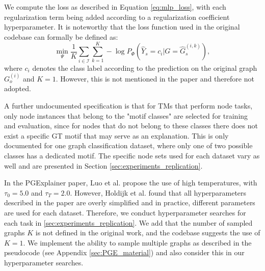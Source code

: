 We compute the loss as described in Equation \ref{eq:mlp_loss}, with each regularization term being added according to a regularization coefficient hyperparameter. It is noteworthy that the loss function used in the original codebase can formally be defined as:
\begin{equation}
    \min_\Psi \frac{1}{K}\sum_{i\in \mathcal{I}}\sum_{k=1}^K -\log P_\Phi(\hat{Y}_s = c_i|G=\hat{G}_s^{(i,k)}),
\end{equation}
where $c_i$ denotes the class label according to the prediction on the original graph $G_o^{(i)}$ and $K=1$. However, this is not mentioned in the paper and therefore not adopted.  \bigskip

A further undocumented specification is that for \acp{TM} that perform node tasks, only node instances that belong to the "motif classes" are selected for training and evaluation, since for nodes that do not belong to these classes there does not exist a specific \ac{GT} motif that may serve as an explanation. This is only documented for one graph classification dataset, where only one of two possible classes has a dedicated motif. The specific node sets used for each dataset vary as well and are presented in Section \ref{sec:experiments_replication}.\bigskip

In the PGExplainer paper, Luo et al. \cite{luo2020parameterized} propose the use of high temperatures, with $\tau_0 = 5.0$ and $\tau_T=2.0$. However, Holdijk et al. \cite{holdijk2021re} found that all hyperparameters described in the paper are overly simplified and in practice, different parameters are used for each dataset. Therefore, we conduct hyperparameter searches for each task in \ref{sec:experiments_replication}. We add that the number of sampled graphs $K$ is not defined in the original work, and the codebase suggests the use of $K=1$. We implement the ability to sample multiple graphs as described in the pseudocode (see Appendix \ref{sec:PGE_material}) and also consider this in our hyperparameter searches. \bigskip

